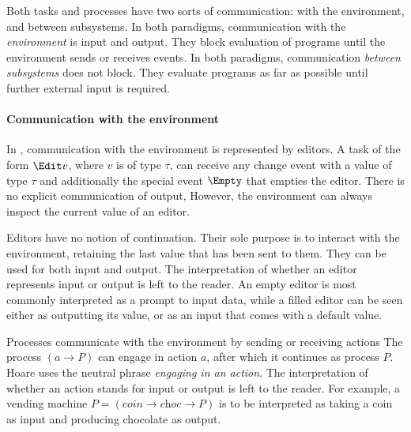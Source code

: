 Both tasks and processes have two sorts of communication: with the environment, and between subsystems.
In both paradigms, communication with the \emph{environment} is input and output.
They block evaluation of programs until the environment sends or receives events.
In both paradigms, communication \emph{between subsystems} does not block.
They evaluate programs as far as possible until further external input is required.



\paragraph{Communication with the environment}

In \TOPHAT, communication with the environment is represented by editors.
A task of the form $\Edit v$, where $v$ is of type $\tau$, can receive any change event with a value of type $\tau$ and additionally the special event $\Empty$ that empties the editor.
There is no explicit communication of output,
However, the environment can always inspect the current value of an editor.

Editors have no notion of continuation.
Their sole purpose is to interact with the environment, retaining the last value that has been sent to them.
%
They can be used for both input and output.
The interpretation of whether an editor represents input or output is left to the reader.
An empty editor is most commonly interpreted as a prompt to input data, while a filled editor can be seen either as outputting its value, or as an input that comes with a default value.

Processes communicate with the environment by sending or receiving actions
The \CSP process $(a \to P)$ can engage in action $a$, after which it continues as process $P$.
Hoare uses the neutral phrase \emph{engaging in an action}.
The interpretation of whether an action stands for input or output is left to the reader.
For example, a vending machine $P = (\textit{coin} \to \textit{choc} \to P)$ is to be interpreted as taking a coin as input and producing chocolate as output.


